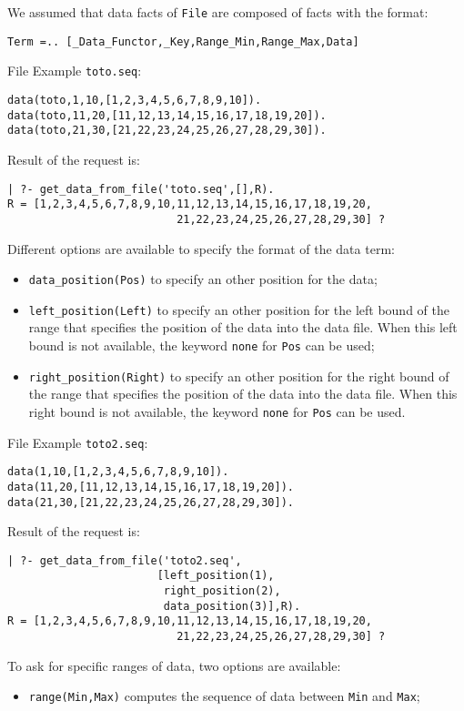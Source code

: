 \documentclass{book}
\begin{document}
\begin{itemize}
We assumed that data facts of \texttt{File} are composed of facts with the format: 
\begin{verbatim}
Term =.. [_Data_Functor,_Key,Range_Min,Range_Max,Data]
\end{verbatim} 
%
File Example \texttt{toto.seq}:
\begin{verbatim}
data(toto,1,10,[1,2,3,4,5,6,7,8,9,10]).
data(toto,11,20,[11,12,13,14,15,16,17,18,19,20]).
data(toto,21,30,[21,22,23,24,25,26,27,28,29,30]).
\end{verbatim}
Result of the request is:
\begin{verbatim}
| ?- get_data_from_file('toto.seq',[],R).
R = [1,2,3,4,5,6,7,8,9,10,11,12,13,14,15,16,17,18,19,20,
                          21,22,23,24,25,26,27,28,29,30] ?
\end{verbatim}
%
Different options are available to specify the format of the data term:
\begin{itemize}
\item \verb+data_position(Pos)+ to specify an other position for the data; 
\item \verb+left_position(Left)+ to specify an other position for the left bound of the range that specifies the position of
           the data into the data file. When this left bound is not available, the keyword \verb+none+ for \verb+Pos+ can be used;
\item \verb+right_position(Right)+ to specify an other position for the right bound of the range that specifies the position of
           the data into the data file. When this right bound is not available, the keyword \verb+none+ for \verb+Pos+ can be used.
\end{itemize} 
%
File Example \texttt{toto2.seq}:
\begin{verbatim}
data(1,10,[1,2,3,4,5,6,7,8,9,10]).
data(11,20,[11,12,13,14,15,16,17,18,19,20]).
data(21,30,[21,22,23,24,25,26,27,28,29,30]).
\end{verbatim}
Result of the request is:
\begin{verbatim}
| ?- get_data_from_file('toto2.seq',
                       [left_position(1),
                        right_position(2),
                        data_position(3)],R).
R = [1,2,3,4,5,6,7,8,9,10,11,12,13,14,15,16,17,18,19,20,
                          21,22,23,24,25,26,27,28,29,30] ?
\end{verbatim}
%
To ask for specific ranges of data, two options are available:
\begin{itemize}
\item \verb+range(Min,Max)+ computes the sequence of data between \verb+Min+ and \verb+Max+; 

\end{itemize}
\end{itemize}
\end{document}
